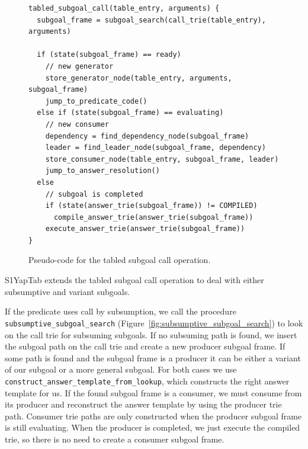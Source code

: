 \begin{figure}[ht]
\begin{Verbatim}
tabled_subgoal_call(table_entry, arguments) {
  subgoal_frame = subgoal_search(call_trie(table_entry), arguments)
  
  if (state(subgoal_frame) == ready)
    // new generator
    store_generator_node(table_entry, arguments, subgoal_frame)
    jump_to_predicate_code()
  else if (state(subgoal_frame) == evaluating)
    // new consumer
    dependency = find_dependency_node(subgoal_frame)
    leader = find_leader_node(subgoal_frame, dependency)
    store_consumer_node(table_entry, subgoal_frame, leader)
    jump_to_answer_resolution()
  else
    // subgoal is completed
    if (state(answer_trie(subgoal_frame)) != COMPILED)
      compile_answer_trie(answer_trie(subgoal_frame))
    execute_answer_trie(answer_trie(subgoal_frame))
}
\end{Verbatim}
\caption{Pseudo-code for the tabled subgoal call operation.}
\label{fig:tabled_subgoal_call}
\end{figure}

S1YapTab extends the tabled subgoal call operation to deal with either subsumptive and variant subgoals.

If the predicate uses call by subsumption, we call the procedure \texttt{subsumptive\_subgoal\_search}
(Figure~\ref{fig:subsumptive_subgoal_search}) to look on the call trie for subsuming subgoals.
If no subsuming path is found, we insert the subgoal path on the call trie and create a new producer
subgoal frame. If some path is found and the subgoal frame is a producer it can be either
a variant of our subgoal or a more general subgoal. For both cases
we use \texttt{construct\_answer\_template\_from\_lookup}, which constructs the right answer template for us.
If the found subgoal frame is a consumer, we must consume from its producer and reconstruct the answer
template by using the producer trie path.
Consumer trie paths are only constructed when the producer subgoal frame is still evaluating.
When the producer is completed, we just execute the compiled trie, so there is no need
to create a consumer subgoal frame.

